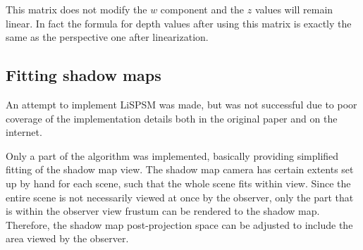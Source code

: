This matrix does not modify the \(w\) component and the \(z\) values will remain linear. In fact the formula for depth values after using this matrix is exactly the same as the perspective one after linearization.

\subsection{Fitting shadow maps}
An attempt to implement LiSPSM was made, but was not successful due to poor coverage of the implementation details both in the original paper and on the internet.

Only a part of the algorithm was implemented, basically providing simplified fitting of the shadow map view. The shadow map camera has certain extents set up by hand for each scene, such that the whole scene fits within view. Since the entire scene is not necessarily viewed at once by the observer, only the part that is within the observer view frustum can be rendered to the shadow map. Therefore, the shadow map post-projection space can be adjusted to include the area viewed by the observer.

